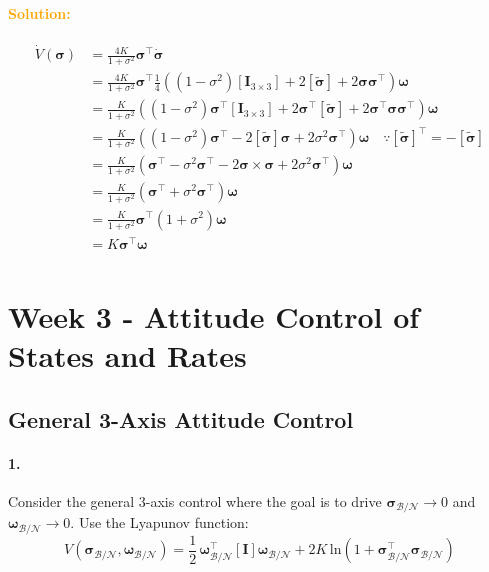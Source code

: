 \documentclass[12pt, a4paper]{article}
\begin{document}
\paragraph{\textcolor{orange}{Solution:}}
\begin{equation*}
    \begin{split}
        \dot{V}(\bm{\sigma})&=\frac{4K}{1+\sigma^{2}}\bm{\sigma}^{\intercal}\dot{\bm{\sigma}}\\
        &=\frac{4K}{1+\sigma^{2}}\bm{\sigma}^{\intercal}\frac{1}{4}\left((1-\sigma^{2})[\bm{I}_{3\times3}]+2[\tilde{\bm{\sigma}}]+2\bm{\sigma}\bm{\sigma}^{\intercal}\right)\bm{\omega}\\
        &=\frac{K}{1+\sigma^{2}}\left((1-\sigma^{2})\bm{\sigma}^{\intercal}[\bm{I}_{3\times3}]+2\bm{\sigma}^{\intercal}[\tilde{\bm{\sigma}}]+2\bm{\sigma}^{\intercal}\bm{\sigma}\bm{\sigma}^{\intercal}\right)\bm{\omega}\\
        &=\frac{K}{1+\sigma^{2}}\left((1-\sigma^{2})\bm{\sigma}^{\intercal}-2[\tilde{\bm{\sigma}}]\bm{\sigma}+2\sigma^{2}\bm{\sigma}^{\intercal}\right)\bm{\omega}\quad\because[\tilde{\bm{\sigma}}]^{\intercal}=-[\tilde{\bm{\sigma}}]\\
        &=\frac{K}{1+\sigma^{2}}\left(\bm{\sigma}^{\intercal}-\sigma^{2}\bm{\sigma}^{\intercal}-2\bm{\sigma}\times\bm{\sigma}+2\sigma^{2}\bm{\sigma}^{\intercal}\right)\bm{\omega}\\
        &=\frac{K}{1+\sigma^{2}}\left(\bm{\sigma}^{\intercal}+\sigma^{2}\bm{\sigma}^{\intercal}\right)\bm{\omega}\\
        &=\frac{K}{1+\sigma^{2}}\bm{\sigma}^{\intercal}\left(1+\sigma^{2}\right)\bm{\omega}\\
        &=K\bm{\sigma}^{\intercal}\bm{\omega}\\
    \end{split}
\end{equation*}

\newpage
\section{Week 3 - Attitude Control of States and Rates}
\subsection{General 3-Axis Attitude Control}
\paragraph{1.}
Consider the general 3-axis control where the goal is to drive $\bm{\sigma}_{\mathcal{B}/\mathcal{N}} \rightarrow 0$ and  $\bm{\omega}_{\mathcal{B}/\mathcal{N}} \rightarrow 0$. Use the Lyapunov function:
$$V(\bm{\sigma}_{\mathcal{B}/\mathcal{N}},\bm{\omega}_{\mathcal{B}/\mathcal{N}}) = \frac{1}{2}\,\bm{\omega}^{\intercal}_{\mathcal{B}/\mathcal{N}}[\bm{I}]\bm{\omega}_{\mathcal{B}/\mathcal{N}} + 2K\, \text{ln} \left( 1 + \bm{\sigma}^{\intercal}_{\mathcal{B}/\mathcal{N}}\bm{\sigma}_{\mathcal{B}/\mathcal{N}} \right)$$
\end{document}
